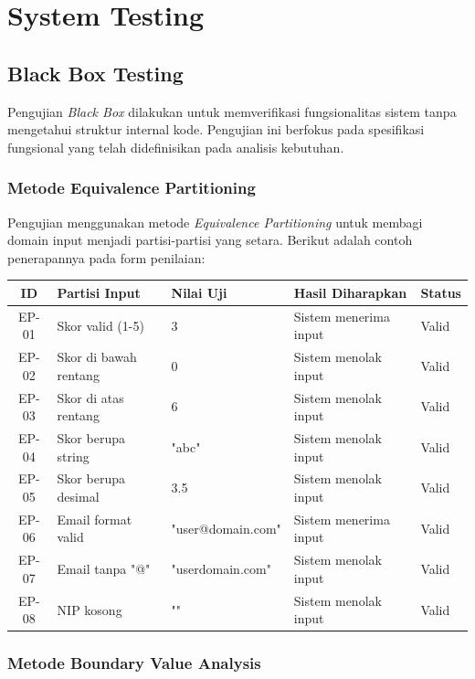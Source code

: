 \documentclass[12pt,a4paper,oneside]{report}
\begin{document}
\section{System Testing}

\subsection{Black Box Testing}

Pengujian \textit{Black Box} dilakukan untuk memverifikasi fungsionalitas sistem tanpa mengetahui struktur internal kode. Pengujian ini berfokus pada spesifikasi fungsional yang telah didefinisikan pada analisis kebutuhan.

\subsubsection{Metode Equivalence Partitioning}

Pengujian menggunakan metode \textit{Equivalence Partitioning} untuk membagi domain input menjadi partisi-partisi yang setara. Berikut adalah contoh penerapannya pada form penilaian:

\begin{longtable}{|c|p{3cm}|p{3cm}|p{3cm}|p{2cm}|}
  \hline
  \textbf{ID} & \textbf{Partisi Input} & \textbf{Nilai Uji} & \textbf{Hasil Diharapkan} & \textbf{Status} \\
  \hline
  EP-01 & Skor valid (1-5) & 3 & Sistem menerima input & Valid \\
  \hline
  EP-02 & Skor di bawah rentang & 0 & Sistem menolak input & Valid \\
  \hline
  EP-03 & Skor di atas rentang & 6 & Sistem menolak input & Valid \\
  \hline
  EP-04 & Skor berupa string & "abc" & Sistem menolak input & Valid \\
  \hline
  EP-05 & Skor berupa desimal & 3.5 & Sistem menolak input & Valid \\
  \hline
  EP-06 & Email format valid & "user@domain.com" & Sistem menerima input & Valid \\
  \hline
  EP-07 & Email tanpa "@" & "userdomain.com" & Sistem menolak input & Valid \\
  \hline
  EP-08 & NIP kosong & "" & Sistem menolak input & Valid \\
  \hline
\end{longtable}

\subsubsection{Metode Boundary Value Analysis}
\end{document}
